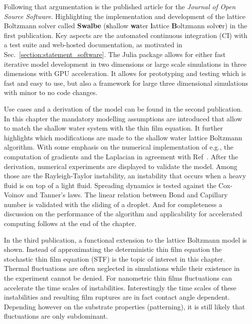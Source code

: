 Following that argumentation is the published article for the \textit{Journal of Open Source Software}. 
Highlighting the implementation and development of the lattice Boltzmann solver called \textbf{Swalbe} (\textbf{s}hallow \textbf{wa}ter \textbf{l}attice \textbf{B}oltzmann solv\textbf{e}r) in the first publication.
Key aspects are the automated continuous integration (CI) with a test suite and web-hosted documentation, as motivated in Sec.~\ref{section:statement_software}.
The Julia package allows for either fast iterative model development in two dimensions or large scale simulations in three dimensions with GPU acceleration.
It allows for prototyping and testing which is fast and easy to use, but also a framework for large three dimensional simulations with minor to no code changes.

Use cases and a derivation of the model can be found in the second publication.
In this chapter the mandatory modelling assumptions are introduced that allow to match the shallow water system with the thin film equation.
It further highlights which modifications are made to the shallow water lattice Boltzmann algorithm. 
With some emphasis on the numerical implementation of e.g., the computation of gradients and the Laplacian in agreement with Ref~\cite{junkDiscretizationsIncompressibleNavier2000, thampiIsotropicDiscreteLaplacian2013}. 
After the derivation, numerical experiments are displayed to validate the model. 
Among those are the Rayleigh-Taylor instability, an instability that occurs when a heavy fluid is on top of a light fluid. 
Spreading dynamics is tested against the Cox-Voinov and Tanner's laws. 
The linear relation between Bond and Capillary number is validated with the sliding of a droplet.
And for completeness a discussion on the performance of the algorithm and applicability for accelerated computing follows at the end of the chapter.

In the third publication, a functional extension to the lattice Boltzmann model is shown.
Instead of approximating the deterministic thin film equation the stochastic thin film equation (STF) is the topic of interest in this chapter.
Thermal fluctuations are often neglected in simulations while their existence in the experiment cannot be denied.
For nanometric thin films fluctuations can accelerate the time scales of instabilities. 
Interestingly the time scales of these instabilities and resulting film ruptures are in fact contact angle dependent.
Depending however on the substrate properties (patterning), it is still likely that fluctuations are only subdominant.

